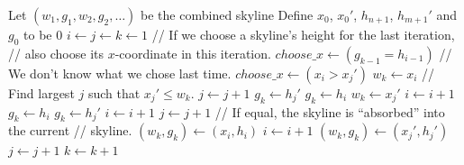 \documentclass{article}
\begin{document}
\begin{enumerate}
\begin{enumerate}
        \begin{algorithmic}[1]
            \State Let $(w_1, g_1, w_2, g_2, \dots)$ be the combined skyline
            \State Define $x_0$, $x_0'$, $h_{n + 1}$, $h_{m + 1}'$ and $g_0$ to be 0
            \State $i \gets j \gets k \gets 1$
            \Repeat
                        \State // If we choose a skyline's height for the last iteration,
                        \State // also choose its $x$-coordinate in this iteration.
                        \State $choose\_x \gets (g_{k - 1} = h_{i - 1})$
                    \Else
                        \State // We don't know what we chose last time.
                        \State $choose\_x \gets (x_i > x_j')$
                    \EndIf
                        \State $w_k \gets x_i$
                        \State // Find largest $j$ such that $x_j' \le w_k$.
                            \State $j \gets j + 1$
                        \EndWhile
                            \State $g_k \gets h_j'$
                        \Else
                            \State $g_k \gets h_i$
                        \EndIf
                    \Else
                        \State $w_k \gets x_j'$
                            \State $i \gets i + 1$
                        \EndWhile
                            \State $g_k \gets h_i$
                        \Else
                            \State $g_k \gets h_j'$
                        \EndIf
                    \EndIf
                    \State $i \gets i + 1$
                    \State $j \gets j + 1$
                \Else
                        \State // If equal, the skyline is ``absorbed'' into the current
                        \State // skyline.
                            \State $(w_k, g_k) \gets (x_i, h_i)$
                        \EndIf
                        \State $i \gets i + 1$
                    \Else
                            \State $(w_k, g_k) \gets (x_j', h_j')$
                        \EndIf
                        \State $j \gets j + 1$
                    \EndIf
                \EndIf
                \State $k \gets k + 1$

\end{algorithmic}
\end{enumerate}
\end{enumerate}
\end{document}
